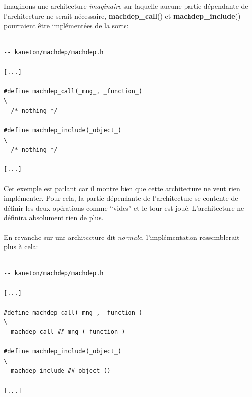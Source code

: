 \documentclass[10pt,a4wide]{article}
\begin{document}
Imaginons une architecture \textit{imaginaire} sur laquelle aucune
partie d\'ependante de l'architecture ne serait n\'ecessaire,
\textbf{machdep\_call}() et \textbf{machdep\_include}() pourraient
\^etre impl\'ement\'ees de la sorte:

\begin{verbatim}

-- kaneton/machdep/machdep.h

[...]

#define machdep_call(_mng_, _function_)                                 \
  /* nothing */

#define machdep_include(_object_)                                       \
  /* nothing */

[...]

\end{verbatim}

\paragraph{}

Cet exemple est parlant car il montre bien que cette architecture ne veut
rien impl\'ementer. Pour cela, la partie d\'ependante de l'architecture
se contente de d\'efinir les deux op\'erations comme ``vides'' et le tour
est jou\'e. L'architecture ne d\'efinira absolument rien de plus.

\paragraph{}

En revanche sur une architecture dit \textit{normale}, l'impl\'ementation
ressemblerait plus \`a cela:

\begin{verbatim}

-- kaneton/machdep/machdep.h

[...]

#define machdep_call(_mng_, _function_)                                 \
  machdep_call_##_mng_(_function_)

#define machdep_include(_object_)                                       \
  machdep_include_##_object_()

[...]

\end{verbatim}

\paragraph{}
\end{document}
